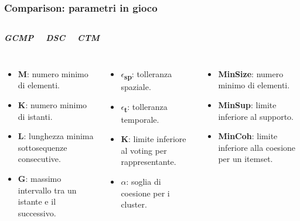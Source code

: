 \documentclass{beamer}
\begin{document}
\begin{frame}
	\frametitle{Comparison: parametri in gioco}
	\begin{columns}
		
		\begin{center}
			\textbf{\textit{\huge{GCMP}}}
			
		\end{center}
		
		\begin{center}
			\textbf{\textit{\huge{DSC}}}
			
		\end{center}
		
		\begin{center}
			\textbf{\textit{\huge{CTM}}}
			
		\end{center}
	\end{columns}
	\begin{columns}
		
		\column{.3\columnwidth}

\begin{itemize}
	\item \textbf{M}: numero minimo di elementi.
	\item \textbf{K}: numero minimo di istanti.
	\item \textbf{L}: lunghezza minima sottosequenze consecutive.
	\item \textbf{G}: massimo intervallo tra un istante e il successivo.
\end{itemize}
		
		
		\column{.3\textwidth}
		
			\begin{itemize}
			\item \textbf{$\epsilon$\textsubscript{sp}}: tolleranza spaziale.
			\item \textbf{$\epsilon$\textsubscript{t}}: tolleranza temporale.
			\item \textbf{K}: limite inferiore al voting per rappresentante.
			\item \textbf{$\alpha$}: soglia di coesione per i cluster. 
		\end{itemize}
		
		\column{.3\textwidth}
		
	\begin{itemize}
		\item \textbf{MinSize}: numero minimo di elementi.
		\item \textbf{MinSup}: limite inferiore al supporto.
		\item \textbf{MinCoh}: limite inferiore alla coesione per un itemset.
	\end{itemize}
		
	\end{columns}
\end{frame}    
\end{document}
